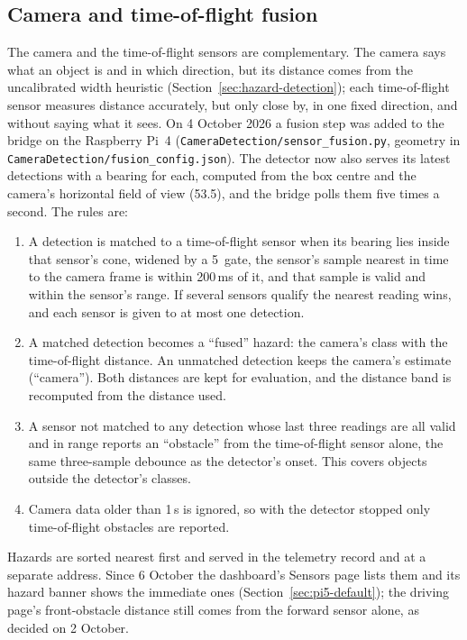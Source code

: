 \subsection{Camera and time-of-flight fusion}
\label{sec:camera-tof-fusion}
The camera and the time-of-flight sensors are complementary. The camera says what an object is and in which direction, but its distance comes from the uncalibrated width heuristic (Section~\ref{sec:hazard-detection}); each time-of-flight sensor measures distance accurately, but only close by, in one fixed direction, and without saying what it sees. On 4 October 2026 a fusion step was added to the bridge on the Raspberry Pi~4 (\texttt{CameraDetection/sensor\_fusion.py}, geometry in \texttt{CameraDetection/fusion\_config.json}). The detector now also serves its latest detections with a bearing for each, computed from the box centre and the camera's horizontal field of view (53.5\textdegree), and the bridge polls them five times a second. The rules are:
\begin{enumerate}
\item A detection is matched to a time-of-flight sensor when its bearing lies inside that sensor's cone, widened by a 5\textdegree\ gate, the sensor's sample nearest in time to the camera frame is within 200\,ms of it, and that sample is valid and within the sensor's range. If several sensors qualify the nearest reading wins, and each sensor is given to at most one detection.
\item A matched detection becomes a ``fused'' hazard: the camera's class with the time-of-flight distance. An unmatched detection keeps the camera's estimate (``camera''). Both distances are kept for evaluation, and the distance band is recomputed from the distance used.
\item A sensor not matched to any detection whose last three readings are all valid and in range reports an ``obstacle'' from the time-of-flight sensor alone, the same three-sample debounce as the detector's onset. This covers objects outside the detector's classes.
\item Camera data older than 1\,s is ignored, so with the detector stopped only time-of-flight obstacles are reported.
\end{enumerate}
Hazards are sorted nearest first and served in the telemetry record and at a separate address. Since 6 October the dashboard's Sensors page lists them and its hazard banner shows the immediate ones (Section~\ref{sec:pi5-default}); the driving page's front-obstacle distance still comes from the forward sensor alone, as decided on 2 October.

